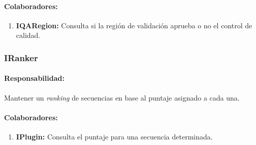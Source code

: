     \paragraph{Colaboradores:}
      \begin{enumerate}
       \item \textbf{IQARegion:} Consulta si la regi\'on de validaci\'on aprueba
o no el control de calidad.
      \end{enumerate}

  \subsubsection{IRanker}
    \paragraph{Responsabilidad:} Mantener un \textit{ranking} de secuencias en
base al puntaje asignado a cada una.       
    \paragraph{Colaboradores:}
      \begin{enumerate}
       \item \textbf{IPlugin:} Consulta el puntaje para una secuencia
determinada.
      \end{enumerate}

